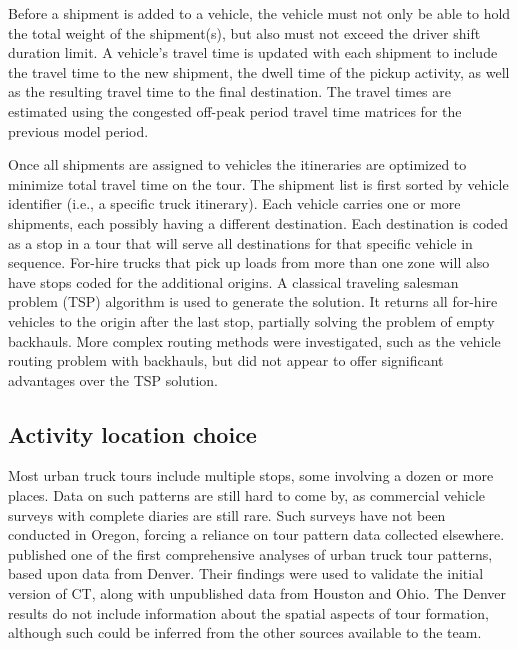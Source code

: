 Before a shipment is added to a vehicle, the vehicle must not only be able to hold the total weight of the shipment(s), but also must not exceed the driver shift duration limit. A vehicle's travel time is updated with each shipment to include the travel time to the new shipment, the dwell time of the pickup activity, as well as the resulting travel time to the final destination. The travel times are estimated using the congested off-peak period travel time matrices for the previous model period.

Once all shipments are assigned to vehicles the itineraries are optimized to minimize total travel time on the tour. The shipment list is first sorted by vehicle identifier (i.e., a specific truck itinerary). Each vehicle carries one or more shipments, each possibly having a different destination. Each destination is coded as a stop in a tour that will serve all destinations for that specific vehicle in sequence. For-hire trucks that pick up loads from more than one zone will also have stops coded for the additional origins. A classical traveling salesman problem (TSP) algorithm is used to generate the solution. It returns all for-hire vehicles to the origin after the last stop, partially solving the problem of empty backhauls. More complex routing methods were investigated, such as the vehicle routing problem with backhauls, but did not appear to offer significant advantages over the TSP solution.

\subsection{Activity location choice}\label{sec:ct-activity-location}

Most urban truck tours include multiple stops, some involving a dozen or more places. Data on such patterns are still hard to come by, as commercial vehicle surveys with complete diaries are still rare. Such surveys have not been conducted in Oregon, forcing a reliance on tour pattern data collected elsewhere. \cite{holguinveras05} published one of the first comprehensive analyses of urban truck tour patterns, based upon data from Denver. Their findings were used to validate the initial version of CT, along with unpublished data from Houston and Ohio. The Denver results do not include information about the spatial aspects of tour formation, although such could be inferred from the other sources available to the team. 

